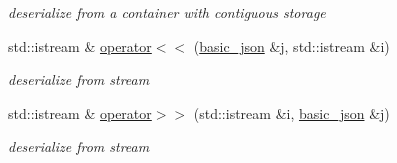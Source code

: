 \begin{DoxyCompactItemize}
\begin{DoxyCompactList}\small\item\em deserialize from a container with contiguous storage \end{DoxyCompactList}\item 
std\+::istream \& \hyperlink{classnlohmann_1_1basic__json_a60ca396028b8d9714c6e10efbf475af6}{operator$<$$<$} (\hyperlink{classnlohmann_1_1basic__json}{basic\+\_\+json} \&j, std\+::istream \&i)
\begin{DoxyCompactList}\small\item\em deserialize from stream \end{DoxyCompactList}\item 
std\+::istream \& \hyperlink{classnlohmann_1_1basic__json_aaf363408931d76472ded14017e59c9e8}{operator$>$$>$} (std\+::istream \&i, \hyperlink{classnlohmann_1_1basic__json}{basic\+\_\+json} \&j)
\begin{DoxyCompactList}\small\item\em deserialize from stream \end{DoxyCompactList}\end{DoxyCompactItemize}
